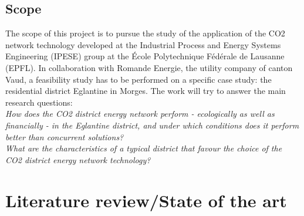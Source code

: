 \documentclass{article}
\begin{document}


\subsection{Scope}
The scope of this project is to pursue the study of the application of the CO2 network technology developed at the Industrial Process and Energy Systems Engineering (IPESE) group at the École Polytechnique Fédérale de Lausanne (EPFL). In collaboration with Romande Energie, the utility company of canton Vaud, a feasibility study has to be performed on a specific case study: the residential district Eglantine in Morges. The work will try to answer the main research questions:\\
\textit{How does the CO2 district energy network perform - ecologically as well as financially - in the Eglantine district, and under which conditions does it perform better than concurrent solutions?}\\
\textit{What are the characteristics of a typical district that favour the choice of the CO2 district energy network technology?}

\section{Literature review/State of the art}
\end{document}
